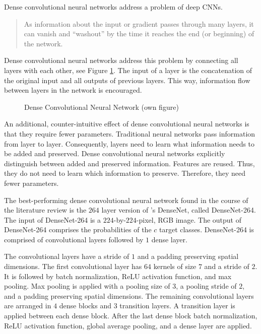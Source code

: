 Dense convolutional neural networks address a problem of deep \ac{CNN}s. \autocite{Huang.2017}
\blockquote[\cite{Huang.2017}]{As information about the input or gradient passes through many layers, it can vanish and \enquote{washout} by the time it reaches the end (or beginning) of the network.
}
Dense convolutional neural networks address this problem by connecting all layers with each other, see Figure \ref{fig:denseconv}. The input of a layer is the concatenation of the original input and all outputs of previous layers. This way, information flow between layers in the network is encouraged. \autocite{Huang.2017}
\begin{figure}[H]
	\centering
	
	\caption{Dense Convolutional Neural Network (own figure)}
	\label{fig:denseconv}
\end{figure}
\par
An additional, counter-intuitive effect of dense convolutional neural networks is that they require fewer parameters. 
Traditional neural networks pass information from layer to layer. Consequently, layers need to learn what information needs to be added and preserved. Dense convolutional neural networks explicitly distinguish between added and preserved information. Features are reused. Thus, they do not need to learn which information to preserve. Therefore, they need fewer parameters. \autocite{Huang.2017}
\par
The best-performing dense convolutional neural network found in the course of the literature review is the $264$ layer version of \cite{Huang.2017}'s DenseNet, called DenseNet-264.
The input of DenseNet-264 is a $224$-by-$224$-pixel, \ac{RGB} image. The output of DenseNet-264 comprises the probabilities of the $c$ target classes. 
DenseNet-264 is comprised of convolutional layers followed by $1$ dense layer. \autocite{Huang.2017}
\par
The convolutional layers have a stride of $1$ and a padding preserving spatial dimensions.
The first convolutional layer has $64$ kernels of size $7$ and a stride of $2$. It is followed by batch normalization, \ac{ReLU} activation function, and max pooling. Max pooling is applied with a pooling size of $3$, a pooling stride of $2$, and a padding preserving spatial dimensions. \autocite{Xie.2017}
The remaining convolutional layers are arranged in $4$ dense blocks and $3$ transition layers. A transition layer is applied between each dense block.
After the last dense block batch normalization, \ac{ReLU} activation function, global average pooling, and a dense layer are applied.

